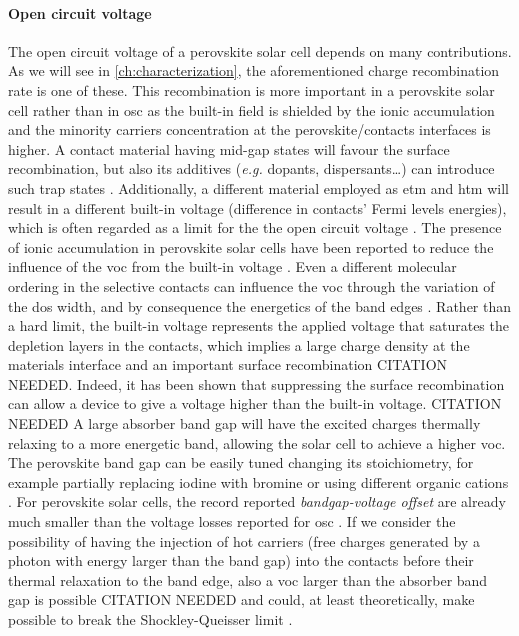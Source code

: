 	\paragraph{Open circuit voltage}
	The open circuit voltage of a perovskite solar cell depends on many contributions.
	As we will see in \cref{ch:characterization}, the aforementioned charge recombination rate is one of these.
	This recombination is more important in a perovskite solar cell rather than in \gls{osc} as the built-in field is shielded by the ionic accumulation and the minority carriers concentration at the perovskite\-/contacts interfaces is higher.
	A contact material having mid-gap states will favour the surface recombination, but also its additives (\textsl{e.g.} dopants, dispersants\dots) can introduce such trap states \cite{Correa-Baena2017}.
	Additionally, a different material employed as \gls{etm} and \gls{htm} will result in a different built-in voltage (difference in contacts' Fermi levels energies), which is often regarded as a limit for the the open circuit voltage \cite{Gelmetti2019,Wu2016}.
	The presence of ionic accumulation in perovskite solar cells have been reported to reduce the influence of the \gls{voc} from the built-in voltage \cite{Belisle2016}.
	Even a different molecular ordering in the selective contacts can influence the \gls{voc} through the variation of the \gls{dos} width, and by consequence the energetics of the band edges \cite{Shao2016}.
	Rather than a hard limit, the built-in voltage represents the applied voltage that saturates the depletion layers in the contacts, which implies a large charge density at the materials interface and an important surface recombination CITATION NEEDED.
	Indeed, it has been shown that suppressing the surface recombination can allow a device to give a voltage higher than the built-in voltage. CITATION NEEDED
	A large absorber band gap will have the excited charges thermally relaxing to a more energetic band, allowing the solar cell to achieve a higher \gls{voc}.
	The perovskite band gap can be easily tuned changing its stoichiometry, for example partially replacing iodine with bromine \cite{McMeekin2016,Noh2013a,Wheeler2017} or using different organic cations \cite{Eperon2014}.
	For perovskite solar cells, the record reported \textit{bandgap\hyp{}voltage offset} are already much smaller than the voltage losses reported for \gls{osc} \cite{Tvingstedt2015}.
	If we consider the possibility of having the injection of hot carriers (free charges generated by a photon with energy larger than the band gap) into the contacts before their thermal relaxation to the band edge, also a \gls{voc} larger than the absorber band gap is possible CITATION NEEDED and could, at least theoretically, make possible to break the Shockley\hyp{}Queisser limit \cite{WikipediaSQlimit}.

